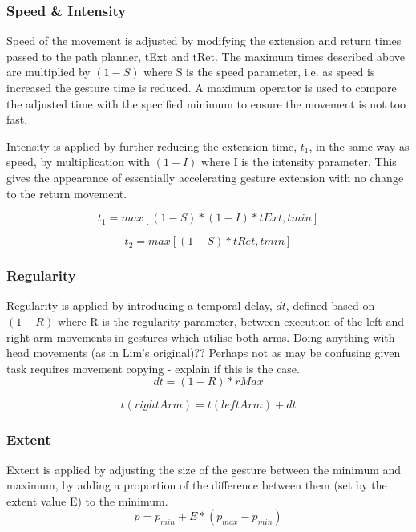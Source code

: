 \documentclass[11pt,a4paper]{report}
\begin{document}
\subsubsection{Speed \& Intensity}
Speed of the movement is adjusted by modifying the extension and return times passed to the path planner, tExt and tRet. The maximum times described above are multiplied by $(1-S)$ where S is the speed parameter, i.e. as speed is increased the gesture time is reduced. A maximum operator is used to compare the adjusted time with the specified minimum to ensure the movement is not too fast.

Intensity is applied by further reducing the extension time, $t_{1}$, in the same way as speed, by multiplication with $(1-I)$ where I is the intensity parameter. This gives the appearance of essentially accelerating gesture extension with no change to the return movement. 

\begin{equation}
t_{1} = max[(1-S)*(1-I)*tExt,tmin]
\end{equation}

\begin{equation}
t_{2} = max[(1-S)*tRet,tmin]
\end{equation}

\subsubsection{Regularity}
Regularity is applied by introducing a temporal delay, $dt$, defined based on $(1-R)$ where R is the regularity parameter, between execution of the left and right arm movements in gestures which utilise both arms. Doing anything with head movements (as in Lim's original)?? Perhaps not as may be confusing given task requires movement copying - explain if this is the case.
\begin{equation}
dt = (1-R)*rMax
\end{equation}

\begin{equation}
t(rightArm) = t(leftArm) + dt
\end{equation}

\subsubsection{Extent}
Extent is applied by adjusting the size of the gesture between the minimum and maximum, by adding a proportion of the difference between them (set by the extent value E) to the minimum. 
\begin{equation}
p = p_{min} + E*(p_{max} - p_{min})
\end{equation}
\end{document}
